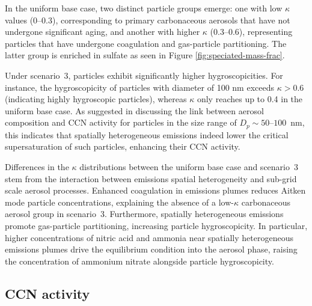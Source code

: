 \documentclass[journal abbreviation, manuscript]{copernicus}
\begin{document}
In the uniform base case, two distinct particle groups emerge: one
with low $\kappa$ values (0--0.3), corresponding to primary
carbonaceous aerosols that have not undergone significant aging, and
another with higher $\kappa$ (0.3--0.6), representing particles that
have undergone coagulation and gas-particle partitioning. The latter
group is enriched in sulfate as seen in Figure
\ref{fig:speciated-mass-frac}.

Under scenario~3, particles exhibit significantly higher
hygroscopicities. For instance, the hygroscopicity of particles with
diameter of 100 nm exceeds $\kappa>0.6$ (indicating highly hygroscopic
particles), whereas $\kappa$ only reaches up to 0.4 in the uniform
base case. As suggested in discussing the link between aerosol 
composition and CCN activity for particles in the size range of 
$D_p\sim50\text{--}100$~nm, this indicates that spatially heterogeneous 
emissions indeed lower the critical supersaturation of such particles, 
enhancing their CCN activity.

Differences in the $\kappa$ distributions between the uniform base
case and scenario~3 stem from the interaction between emissions
spatial heterogeneity and sub-grid scale aerosol processes. Enhanced
coagulation in emissions plumes reduces Aitken mode particle
concentrations, explaining the absence of a low-$\kappa$ carbonaceous
aerosol group in scenario~3. Furthermore, spatially heterogeneous
emissions promote gas-particle partitioning, increasing particle
hygroscopicity. In particular, higher concentrations of nitric acid
and ammonia near spatially heterogeneous emissions plumes drive the
equilibrium condition into the aerosol phase, raising the
concentration of ammonium nitrate alongside particle hygroscopicity.


\subsection{CCN activity}\label{sec:ccn-activ}
\end{document}
